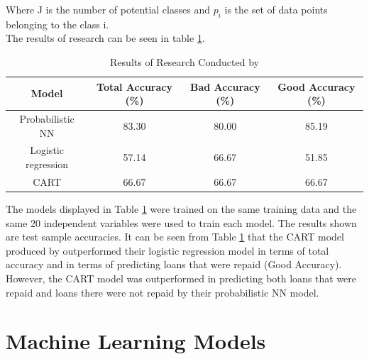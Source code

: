 \vspace{10pt}

Where J is the number of potential classes and $p_{i}$ is the set of data points belonging to the class i. \\

The results of \textcite{DecTreesZekic} research can be seen in table \ref{table:CART}. \\

\begin{table}[H]
\begin{center}
\begin{tabular}{|c|c|c|c|} 
\hline
\multicolumn{1}{|c}{Model}  &\multicolumn{1}{|c|}{Total Accuracy (\%)}  &\multicolumn{1}{|c|}{Bad Accuracy (\%)} & \multicolumn{1}{c|}{Good Accuracy (\%)}\\
\hline
Probabilistic NN & 83.30 &  80.00 & 85.19 \\
\hline
Logistic regression & 57.14 &  66.67 & 51.85 \\
\hline
CART & 66.67 &  66.67 & 66.67 \\
\hline
\end{tabular}
\end{center}
\caption{Results of Research Conducted by \textcite{DecTreesZekic} }
\label{table:CART}
\end{table}

\vspace{10pt}

The models displayed in Table \ref{table:CART} were trained on the same training data and the same 20 independent variables were used to train each model. The results shown are test sample accuracies. It can be seen from Table \ref{table:CART} that the CART model produced by \textcite{DecTreesZekic} outperformed their logistic regression model in terms of total accuracy and in terms of predicting loans that were repaid (Good Accuracy). However, the CART model was outperformed in predicting both loans that were repaid and loans there were not repaid by their probabilistic NN model.  \\



\section{Machine Learning Models}

